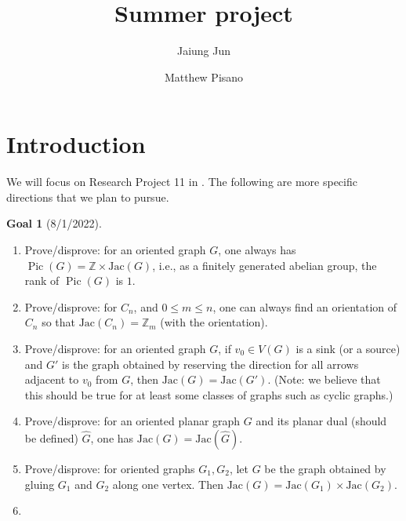 \documentclass[11pt,reqno]{amsart}
\DeclareMathOperator{\Pic}{Pic}
\newcommand{\Jac}{\textrm{Jac}}{}
\theoremstyle{definition}
\newtheorem*{goal}{\textbf{Goal}}
\theoremstyle{plain}
\begin{document}
\title{Summer project}
%

\author{Jaiung Jun}
\address{Department of Mathematics, State University of New York at New Paltz, NY 12561, USA}

\author{Matthew Pisano}
\address{State University of New York at Binghamton, NY 13902, USA}


%

%
\makeatletter
{}
\makeatother


\begin{abstract}

\end{abstract}

\maketitle


\section{Introduction}


We will focus on Research Project 11 in \cite{glass2020chip}. The following are more specific directions that we plan to pursue. 


\begin{goal}[8/1/2022]$ $
	\begin{enumerate}
\item 
Prove/disprove: for an oriented graph $G$, one always has $\Pic(G)=\mathbb{Z} \times \Jac(G)$, i.e., as a finitely generated abelian group, the rank of $\Pic(G)$ is $1$.
		\item 
Prove/disprove: for $C_n$, and $0 \leq m \leq n$, one can always find an orientation of $C_n$ so that $\Jac(C_n)=\mathbb{Z}_m$ (with the orientation). 
\item 
Prove/disprove: for an oriented graph $G$, if $v_0 \in V(G)$ is a sink (or a source) and $G'$ is the graph obtained by reserving the direction for all arrows adjacent to $v_0$ from $G$, then $\Jac(G)=\Jac(G')$. (Note: we believe that this should be true for at least some classes of graphs such as cyclic graphs.)
\item 
Prove/disprove: for an oriented planar graph $G$ and its planar dual (should be defined) $\hat{G}$, one has $\Jac(G)=\Jac(\hat{G})$. 
\item 
Prove/disprove: for oriented graphs $G_1,G_2$, let $G$ be the graph obtained by gluing $G_1$ and $G_2$ along one vertex. Then $\Jac(G)=\Jac(G_1) \times \Jac(G_2)$. 
\item 

	\end{enumerate}
\end{goal}
\end{document}
